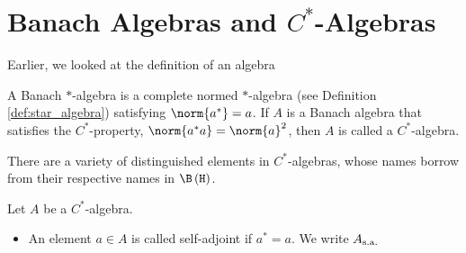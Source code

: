\section{Banach Algebras and \texorpdfstring{$C^{\ast}$-Algebras}{C*-Algebras}}%
Earlier, we looked at the definition of an algebra
\begin{definition}
  A Banach $\ast$-algebra is a complete normed $\ast$-algebra (see Definition \ref{def:star_algebra}) satisfying $\norm{a^{\ast}} = a$. If $A$ is a Banach algebra that satisfies the $C^{\ast}$-property, $\norm{a^{\ast}a} = \norm{a}^2$, then $A$ is called a $C^{\ast}$-algebra.
\end{definition}
There are a variety of distinguished elements in $C^{\ast}$-algebras, whose names borrow from their respective names in $\B\left(\mathcal{H}\right)$.
\begin{definition}
  Let $A$ be a $C^{\ast}$-algebra.
  \begin{itemize}
    \item An element $a\in A$ is called self-adjoint if $a^{\ast} = a$. We write $A_{\operatorname{s.a.}}$
  \end{itemize}
\end{definition}

